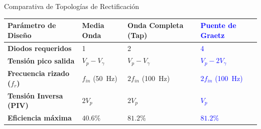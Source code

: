 \documentclass[10pt, aspectratio=169]{beamer}
\begin{document}
\begin{frame}{Comparativa de Topologías de Rectificación}
  \begin{table}
    \centering
    \renewcommand{\arraystretch}{1.5}
    \begin{tabularx}{\textwidth}{@{} >{\bfseries}l X X X @{}}
      \toprule
      Parámetro de Diseño & Media Onda & Onda Completa (Tap) & \textcolor{blue}{Puente de Graetz} \\
      \midrule
      Diodos requeridos & 1 & 2 & \textcolor{blue}{4} \\
      Tensión pico salida & $V_p - V_\gamma$ & $V_p - V_\gamma$ & \textcolor{blue}{$V_p - 2V_\gamma$} \\
      Frecuencia rizado ($f_r$) & $f_{in}$ (\qty{50}{\hertz}) & $2f_{in}$ (\qty{100}{\hertz}) & \textcolor{blue}{$2f_{in}$ (\qty{100}{\hertz})} \\
      Tensión Inversa (PIV) & $2V_p$ & $2V_p$ & \textcolor{blue}{$V_p$} \\
      Eficiencia máxima & $40.6\%$ & $81.2\%$ & \textcolor{blue}{$81.2\%$} \\
      \bottomrule
    \end{tabularx}
  \end{table}
\end{frame}
\end{document}
